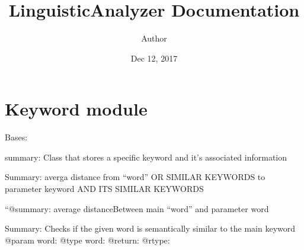\documentclass[letterpaper,10pt,english]{sphinxmanual}
\title{LinguisticAnalyzer Documentation}
\date{Dec 12, 2017}
\author{Author}
\begin{document}
\maketitle
\sphinxtableofcontents
{}\label{\detokenize{index::doc}}



\chapter{Keyword module}
\label{\detokenize{Keyword:welcome-to-linguistic-analyzer-s-documentation}}\label{\detokenize{Keyword::doc}}\label{\detokenize{Keyword:module-Keyword}}\label{\detokenize{Keyword:keyword-module}}

\begin{fulllineitems}
\label{\detokenize{Keyword:Keyword.Keyword}}
Bases: 

summary: Class that stores a specific keyword and it’s associated information

\begin{fulllineitems}
\label{\detokenize{Keyword:Keyword.Keyword.averagedistancefromkeywordtokeyword}}
Summary: averga distance from “word” OR SIMILAR KEYWORDS to parameter keyword AND ITS SIMILAR KEYWORDS

\end{fulllineitems}


\begin{fulllineitems}
\label{\detokenize{Keyword:Keyword.Keyword.averagedistanceto}}
“@summary:  average distanceBetween main “word” and parameter word

\end{fulllineitems}


\begin{fulllineitems}
\label{\detokenize{Keyword:Keyword.Keyword.determinesimilarity}}
Summary: Checks if the given word is semantically similar to the main keyword
@param word:
@type word:
@return:
@rtype:


\end{fulllineitems}
\end{fulllineitems}
\end{document}
